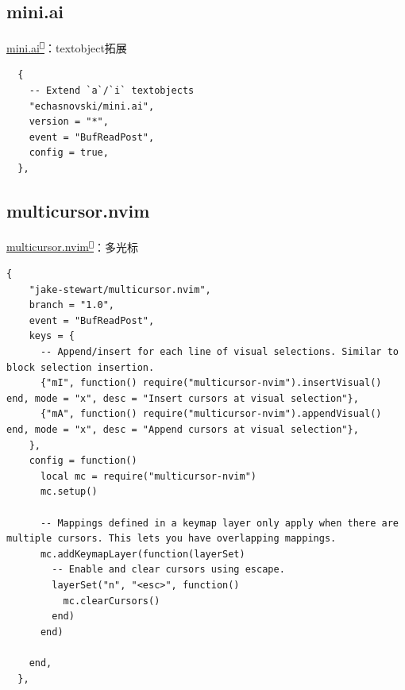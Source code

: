 \documentclass[aspectratio=169]{ctexbeamer}
\newcommand{\nerd}[1]{\texttt{#1}}
\newcommand{\link}[3][]{\href{#3}{#2\textsuperscript{\nerd{}}}}
\begin{document}
  \subsection{mini.ai}
    \begin{frame}[fragile]{\link{mini.ai}{https://github.com/echasnovski/mini.ai}：textobject拓展}

      \begin{lstlisting}
  {
    -- Extend `a`/`i` textobjects
    "echasnovski/mini.ai",
    version = "*",
    event = "BufReadPost",
    config = true,
  },
      \end{lstlisting}

    \end{frame}

  \subsection{multicursor.nvim}
    \begin{frame}[fragile]{\link{multicursor.nvim}{https://github.com/jake-stewart/multicursor.nvim}：多光标}

      \begin{lstlisting}[basicstyle=\tiny\ttfamily]
  {
    "jake-stewart/multicursor.nvim",
    branch = "1.0",
    event = "BufReadPost",
    keys = {
      -- Append/insert for each line of visual selections. Similar to block selection insertion.
      {"mI", function() require("multicursor-nvim").insertVisual() end, mode = "x", desc = "Insert cursors at visual selection"},
      {"mA", function() require("multicursor-nvim").appendVisual() end, mode = "x", desc = "Append cursors at visual selection"},
    },
    config = function()
      local mc = require("multicursor-nvim")
      mc.setup()

      -- Mappings defined in a keymap layer only apply when there are multiple cursors. This lets you have overlapping mappings.
      mc.addKeymapLayer(function(layerSet)
        -- Enable and clear cursors using escape.
        layerSet("n", "<esc>", function()
          mc.clearCursors()
        end)
      end)

    end,
  },
      \end{lstlisting}
    \end{frame}
\end{document}
